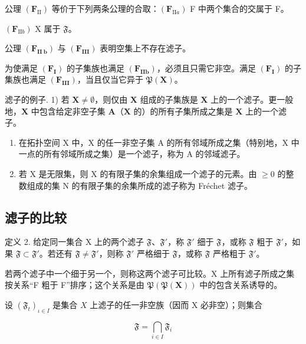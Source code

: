 公理 \((\mathbf{F}_{\mathrm{II}})\) 等价于下列两条公理的合取：\((\mathbf{F}_{\mathrm{II}a})\) F 中两个集合的交属于 F。

\((\mathbf{F}_{\mathrm{II}b})\) X 属于 \(\mathfrak{F}\)。

公理 \((\mathbf{F}_{\mathbf{II}\ \mathbf{b}})\) 与 \((\mathbf{F}_{\mathbf{III}})\) 表明空集上不存在滤子。

为使满足 \((\mathbf{F}_{\mathbf{I}})\) 的子集族也满足 \((\mathbf{F}_{\mathbf{II}\mathbf{b}})\)，必须且只需它非空。满足 \((\mathbf{F}_{\mathbf{I}})\) 的子集族也满足 \((\mathbf{F}_{\mathbf{III}})\)，当且仅当它异于 \(\mathfrak{P}(\mathbf{X})\)。

滤子的例子. 1) 若 \(\mathbf{X} \neq \emptyset\)，则仅由 \(\mathbf{X}\) 组成的子集族是 \(\mathbf{X}\) 上的一个滤子。更一般地，\(\mathbf{X}\) 中包含给定非空子集 \(\mathbf{A}\)（\(\mathbf{X}\) 的）的所有子集所成之集是 \(\mathbf{X}\) 上的一个滤子。

\begin{enumerate}
\def\labelenumi{\arabic{enumi})}
\setcounter{enumi}{1}
\item
  在拓扑空间 X 中，X 的任一非空子集 A 的所有邻域所成之集（特别地，X 中一点的所有邻域所成之集）是一个滤子，称为 A 的邻域滤子。
\item
  若 X 是无限集，则 X 的有限子集的余集组成一个滤子的元素。由 \(\geqslant0\) 的整数组成的集 N 的有限子集的余集所成的滤子称为 Fréchet 滤子。
\end{enumerate}

\subsection{滤子的比较}

定义 2. 给定同一集合 X 上的两个滤子 \(\mathfrak{F}\)、\(\mathfrak{F}'\)，称 \(\mathfrak{F}'\) 细于 \(\mathfrak{F}\)，或称 \(\mathfrak{F}\) 粗于 \(\mathfrak{F}'\)，如果 \(\mathfrak{F} \subset \mathfrak{F}'\)。若还有 \(\mathfrak{F} \neq \mathfrak{F}'\)，则称 \(\mathfrak{F}'\) 严格细于 \(\mathfrak{F}\)，或称 \(\mathfrak{F}\) 严格粗于 \(\mathfrak{F}'\)。

若两个滤子中一个细于另一个，则称这两个滤子可比较。X 上所有滤子所成之集按关系“F 粗于 F”排序；这个关系是由 \(\mathfrak{P}(\mathfrak{P}(\mathbf{X}))\) 中的包含关系诱导的。

设 \((\mathfrak{F}_t)_{\iota \in I}\) 是集合 \(X\) 上滤子的任一非空族（因而 X 必非空）；则集合

\[
\mathfrak {F} = \bigcap_ {i \in I} \mathfrak {F} _ {i}
\]

